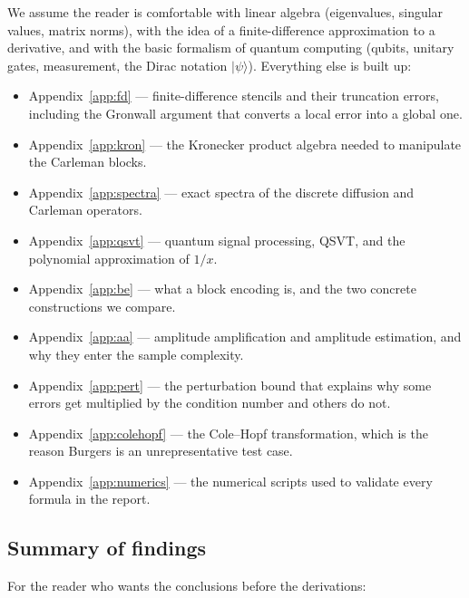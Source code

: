 \documentclass[11pt,a4paper]{article}
\theoremstyle{plain}
\theoremstyle{definition}
\theoremstyle{remark}
\newcommand{\ket}[1]{\lvert #1 \rangle}
\begin{document}
We assume the reader is comfortable with linear algebra (eigenvalues, singular
values, matrix norms), with the idea of a finite-difference approximation to a
derivative, and with the basic formalism of quantum computing (qubits, unitary
gates, measurement, the Dirac notation $\ket{\psi}$).  Everything else is built
up:

\begin{itemize}[nosep,leftmargin=*]
\item Appendix~\ref{app:fd} --- finite-difference stencils and their truncation
      errors, including the Gronwall argument that converts a local error into a
      global one.
\item Appendix~\ref{app:kron} --- the Kronecker product algebra needed to
      manipulate the Carleman blocks.
\item Appendix~\ref{app:spectra} --- exact spectra of the discrete diffusion and
      Carleman operators.
\item Appendix~\ref{app:qsvt} --- quantum signal processing, QSVT, and the
      polynomial approximation of $1/x$.
\item Appendix~\ref{app:be} --- what a block encoding is, and the two concrete
      constructions we compare.
\item Appendix~\ref{app:aa} --- amplitude amplification and amplitude
      estimation, and why they enter the sample complexity.
\item Appendix~\ref{app:pert} --- the perturbation bound that explains why some
      errors get multiplied by the condition number and others do not.
\item Appendix~\ref{app:colehopf} --- the Cole--Hopf transformation, which is
      the reason Burgers is an unrepresentative test case.
\item Appendix~\ref{app:numerics} --- the numerical scripts used to validate
      every formula in the report.
\end{itemize}

\subsection{Summary of findings}
\label{sec:summary}

For the reader who wants the conclusions before the derivations:
\end{document}
